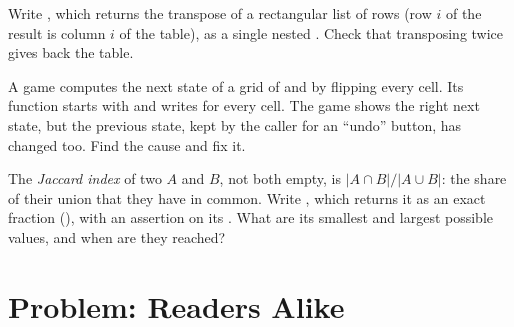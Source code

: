 \begin{exercise}[$\star\star\star$]\label{exo:g10:tuples-sets-comprehensions:13}
Write , which returns the transpose of a rectangular list of rows (row $i$ of the result is
column $i$ of the table), as a single nested . Check that transposing twice gives back the table.
\end{exercise}

\begin{exercise}[$\star\star\star$]\label{exo:g10:tuples-sets-comprehensions:14}
A game computes the next state of a grid of  and  by flipping every cell. Its function starts with
 and writes  for every cell. The game shows the right next
state, but the previous state, kept by the caller for an ``undo'' button, has changed too. Find the cause and fix it.
\end{exercise}

\begin{exercise}[$\star\star\star$]\label{exo:g10:tuples-sets-comprehensions:15}
The \emph{Jaccard index} of two  $A$ and $B$, not both empty, is $|A \cap B| / |A \cup B|$: the share of their
union that they have in common. Write , which returns it as an exact fraction
(), with an assertion on its . What are its smallest and largest possible
values, and when are they reached?
\end{exercise}

\section{Problem: Readers Alike}\label{sec:g10:tuples-sets-comprehensions:problem}


